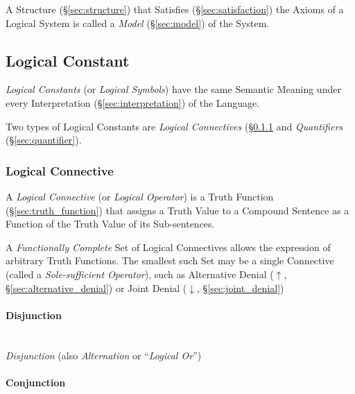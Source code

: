 A Structure (\S\ref{sec:structure}) that Satisfies
(\S\ref{sec:satisfaction}) the Axioms of a Logical System is called a
\emph{Model} (\S\ref{sec:model}) of the System.



\subsection{Logical Constant}\label{sec:logical_constant}

\emph{Logical Constants} (or \emph{Logical Symbols}) have the same
Semantic Meaning under every Interpretation
(\S\ref{sec:interpretation}) of the Language.

Two types of Logical Constants are \emph{Logical Connectives}
(\S\ref{sec:logical_connective} and \emph{Quantifiers}
(\S\ref{sec:quantifier}).



\subsubsection{Logical Connective}\label{sec:logical_connective}

A \emph{Logical Connective} (or \emph{Logical Operator}) is a Truth
Function (\S\ref{sec:truth_function}) that assigns a Truth Value to a
Compound Sentence as a Function of the Truth Value of its
Sub-sentences.

A \emph{Functionally Complete} Set of Logical Connectives allows the
expression of arbitrary Truth Functions. The smallest such Set may be
a single Connective (called a \emph{Sole-sufficient Operator}), such
as Alternative Denial ($\uparrow$, \S\ref{sec:alternative_denial}) or
Joint Denial ($\downarrow$, \S\ref{sec:joint_denial})



\paragraph{Disjunction}\label{sec:disjunction}\hfill \\

\emph{Disjunction} (also \emph{Alternation} or ``\emph{Logical Or}'')



\paragraph{Conjunction}\label{sec:conjunction}\hfill \\

